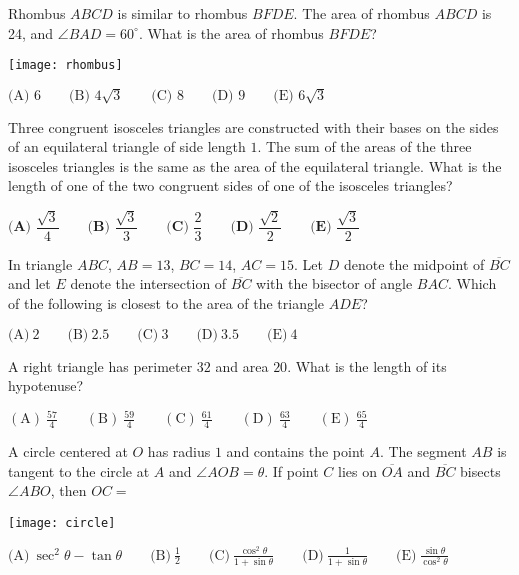 \begin{problem}
Rhombus $ABCD$ is similar to rhombus $BFDE$. The area of rhombus $ABCD$ is 24, and $\angle BAD = 60^\circ$. What is the area of rhombus $BFDE$?
 \begin{center}
    \texttt{[image: rhombus]}
    \end{center}
$\textrm{(A) } 6 \qquad \textrm{(B) } 4\sqrt {3} \qquad \textrm{(C) } 8 \qquad \textrm{(D) } 9 \qquad \textrm{(E) } 6\sqrt {3}$
\end{problem}

\begin{problem}
Three congruent isosceles triangles are constructed with their bases on the sides of an equilateral triangle of side length $1$. The sum of the areas of the three isosceles triangles is the same as the area of the equilateral triangle. What is the length of one of the two congruent sides of one of the isosceles triangles? \vspace{0.2in}

$\textbf{(A) }\dfrac{\sqrt3}4\qquad \textbf{(B) }\dfrac{\sqrt3}3\qquad \textbf{(C) }\dfrac23\qquad \textbf{(D) }\dfrac{\sqrt2}2\qquad \textbf{(E) }\dfrac{\sqrt3}2$
\end{problem}

\begin{problem}
In triangle $ABC$, $AB = 13$, $BC = 14$, $AC = 15$. Let $D$ denote the midpoint of $\overline{BC}$ and let $E$ denote the intersection of $\overline{BC}$ with the bisector of angle $BAC$. Which of the following is closest to the area of the triangle $ADE$? \vspace{0.2in}

$\text {(A)}\ 2 \qquad \text {(B)}\ 2.5 \qquad \text {(C)}\ 3 \qquad \text {(D)}\ 3.5 \qquad \text {(E)}\ 4$
\end{problem}

\begin{problem}
A right triangle has perimeter $32$ and area $20$. What is the length of its hypotenuse? \vspace{0.2in}

$\mathrm{(A)}\ \frac{57}{4}\qquad\mathrm{(B)}\ \frac{59}{4}\qquad\mathrm{(C)}\ \frac{61}{4}\qquad\mathrm{(D)}\ \frac{63}{4}\qquad\mathrm{(E)}\ \frac{65}{4}$
\end{problem}

\begin{problem}
A circle centered at $O$ has radius $1$ and contains the point $A$. The segment $AB$ is tangent to the circle at $A$ and $\angle AOB = \theta$. If point $C$ lies on $\overline{OA}$ and $\overline{BC}$ bisects $\angle ABO$, then $OC =$
\begin{center}
\texttt{[image: circle]}
\end{center}
$\text {(A)}\ \sec^2 \theta - \tan \theta \qquad \text {(B)}\ \frac 12 \qquad \text {(C)}\ \frac{\cos^2 \theta}{1 + \sin \theta}\qquad \text {(D)}\ \frac{1}{1+\sin\theta} \qquad \text {(E)}\ \frac{\sin \theta}{\cos^2 \theta}$
\end{problem}